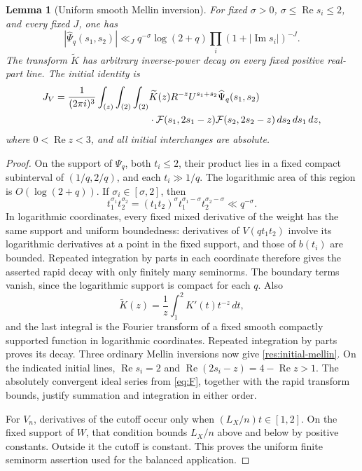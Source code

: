 \documentclass[11pt]{article}
\numberwithin{equation}{section}
\newcommand{\F}{\mathcal F}
\newcommand{\Rea}{\operatorname{Re}}
\newcommand{\Ima}{\operatorname{Im}}
\newtheorem{lemma}[theorem]{Lemma}
\begin{document}
\begin{lemma}[Uniform smooth Mellin inversion]\label{res:smooth}
For fixed \(\sigma>0\), \(\sigma\leq\Rea s_i\leq2\), and every
fixed \(J\), one has
\[
 |\widehat\Psi_q(s_1,s_2)|
 \ll_J q^{-\sigma}\log(2+q)
 \prod_i(1+|\Ima s_i|)^{-J}.
\]
The transform \(\widetilde K\) has arbitrary inverse-power decay
on every fixed positive real-part line. The initial identity is
\begin{align}\label{res:initial-mellin}
 J_V=\frac1{(2\pi i)^3}
 \int_{(z)}\int_{(2)}\int_{(2)}
 &\widetilde K(z)R^{-z}U^{s_1+s_2}
 \widehat\Psi_q(s_1,s_2)\\
 &{}\cdot\F(s_1,2s_1-z)\F(s_2,2s_2-z)\,ds_2\,ds_1\,dz,
 \notag
\end{align}
where \(0<\Rea z<3\), and all initial interchanges are absolute.
\end{lemma}
\begin{proof}
On the support of \(\Psi_q\), both \(t_i\leq2\), their product
lies in a fixed compact subinterval of \((1/q,2/q)\), and each
\(t_i\gg1/q\). The logarithmic area of this region is
\(O(\log(2+q))\). If \(\sigma_i\in[\sigma,2]\), then
\[
 t_1^{\sigma_1}t_2^{\sigma_2}
 =(t_1t_2)^\sigma
 t_1^{\sigma_1-\sigma}t_2^{\sigma_2-\sigma}
 \ll q^{-\sigma}.
\]
In logarithmic coordinates, every fixed mixed derivative of the
weight has the same support and uniform boundedness: derivatives
of \(V(qt_1t_2)\) involve its logarithmic derivatives at a point
in the fixed support, and those of \(b(t_i)\) are bounded.
Repeated integration by parts in each coordinate therefore gives
the asserted rapid decay with only finitely many seminorms.
The boundary terms vanish, since the logarithmic support is compact
for each \(q\).
Also
\[
 \widetilde K(z)=\frac1z\int_1^2K'(t)t^{-z}\,dt,
\]
and the last integral is the Fourier transform of a fixed smooth
compactly supported function in logarithmic coordinates.
Repeated integration by parts proves its decay.
Three ordinary Mellin inversions now give
\eqref{res:initial-mellin}. On the indicated initial lines,
\(\Rea s_i=2\) and \(\Rea(2s_i-z)=4-\Rea z>1\).
The absolutely convergent ideal series from \eqref{eq:F},
together with the rapid transform bounds, justify summation and
integration in either order.

For \(V_n\), derivatives of the cutoff occur only when
\((L_X/n)t\in[1,2]\). On the fixed support of \(W\), that condition
bounds \(L_X/n\) above and below by positive constants.
Outside it the cutoff is constant. This proves the uniform finite
seminorm assertion used for the balanced application.
\end{proof}
\end{document}
